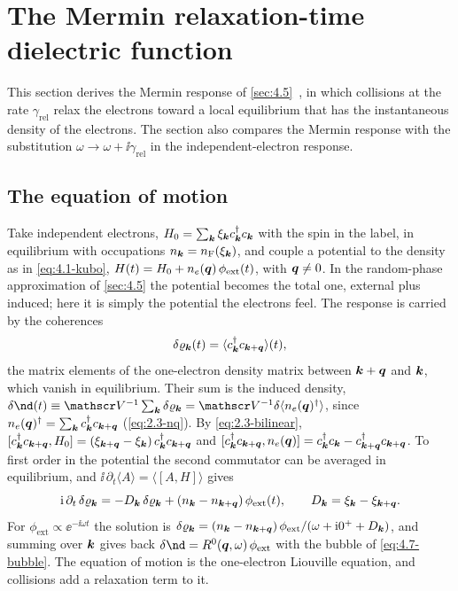 \section{The Mermin relaxation-time dielectric function}\label{app:D.9}

This section derives the Mermin response of \cref{sec:4.5}~\cite{mermin1970lindhard}, in which collisions at the rate $\gamma_{\mathrm{rel}}$ relax the electrons toward a local equilibrium that has the instantaneous density of the electrons. The section also compares the Mermin response with the substitution $\omega \to \omega + \ii\gamma_{\mathrm{rel}}$ in the independent-electron response.

\subsection*{The equation of motion}

Take independent electrons, $H_0 = \sum_{\bm{k}}\xi_{\bm{k}}c^\dagger_{\bm{k}}c_{\bm{k}}$ with the spin in the label, in equilibrium with occupations $n_{\bm{k}} = n_{\mathrm{F}}(\xi_{\bm{k}})$, and couple a potential to the density as in \cref{eq:4.1-kubo}, $H(t) = H_0 + n_e(\bm{q})\,\phi_{\mathrm{ext}}(t)$, with $\bm{q} \ne 0$. In the random-phase approximation of \cref{sec:4.5} the potential becomes the total one, external plus induced; here it is simply the potential the electrons feel. The response is carried by the coherences
\begin{equation*}
  \delta\varrho_{\bm{k}}(t) = \langle c^\dagger_{\bm{k}}c_{\bm{k}+\bm{q}}\rangle(t) ,
\end{equation*}
the matrix elements of the one-electron density matrix between $\bm{k} + \bm{q}$ and $\bm{k}$, which vanish in equilibrium. Their sum is the induced density, $\delta\nd(t) \equiv \Vol^{-1}\sum_{\vect{k}}\delta\varrho_{\vect{k}} = \Vol^{-1}\delta\langle n_e(\vect{q})^\dagger\rangle$, since $n_e(\bm{q})^\dagger = \sum_{\bm{k}}c^\dagger_{\bm{k}}c_{\bm{k}+\bm{q}}$ (\cref{eq:2.3-nq}). By \cref{eq:2.3-bilinear}, $[c^\dagger_{\bm{k}}c_{\bm{k}+\bm{q}}, H_0] = (\xi_{\bm{k}+\bm{q}} - \xi_{\bm{k}})\,c^\dagger_{\bm{k}}c_{\bm{k}+\bm{q}}$ and $[c^\dagger_{\bm{k}}c_{\bm{k}+\bm{q}}, n_e(\bm{q})] = c^\dagger_{\bm{k}}c_{\bm{k}} - c^\dagger_{\bm{k}+\bm{q}}c_{\bm{k}+\bm{q}}$. To first order in the potential the second commutator can be averaged in equilibrium, and $\ii\,\partial_t\langle A\rangle = \langle[A, H]\rangle$ gives
\begin{equation*}
  \mathrm{i}\,\partial_t\,\delta\varrho_{\bm{k}} = -D_{\bm{k}}\,\delta\varrho_{\bm{k}} + (n_{\bm{k}} - n_{\bm{k}+\bm{q}})\,\phi_{\mathrm{ext}}(t), \qquad D_{\bm{k}} = \xi_{\bm{k}} - \xi_{\bm{k}+\bm{q}} .
\end{equation*}
For $\phi_{\mathrm{ext}} \propto \ee^{-\ii\omega t}$ the solution is $\delta\varrho_{\bm{k}} = (n_{\bm{k}} - n_{\bm{k}+\bm{q}})\,\phi_{\mathrm{ext}}/(\omega + \mathrm{i}0^+ + D_{\bm{k}})$, and summing over $\bm{k}$ gives back $\delta\nd = R^0(\vect{q},\omega)\,\phi_{\mathrm{ext}}$ with the bubble of \cref{eq:4.7-bubble}. The equation of motion is the one-electron Liouville equation, and collisions add a relaxation term to it.

